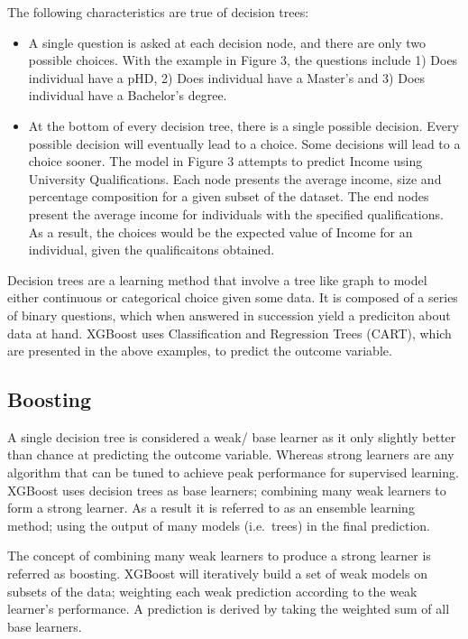 \documentclass[]{book}
\providecommand{\tightlist}{%
  \setlength{\itemsep}{0pt}\setlength{\parskip}{0pt}}
\begin{document}
The following characteristics are true of decision trees:

\begin{itemize}
\tightlist
\item
  A single question is asked at each decision node, and there are only
  two possible choices. With the example in Figure 3, the questions
  include 1) Does individual have a pHD, 2) Does individual have a
  Master's and 3) Does individual have a Bachelor's degree.\\
\item
  At the bottom of every decision tree, there is a single possible
  decision. Every possible decision will eventually lead to a choice.
  Some decisions will lead to a choice sooner. The model in Figure 3
  attempts to predict Income using University Qualifications. Each node
  presents the average income, size and percentage composition for a
  given subset of the dataset. The end nodes present the average income
  for individuals with the specified qualifications. As a result, the
  choices would be the expected value of Income for an individual, given
  the qualificaitons obtained.
\end{itemize}

Decision trees are a learning method that involve a tree like graph to
model either continuous or categorical choice given some data. It is
composed of a series of binary questions, which when answered in
succession yield a prediciton about data at hand. XGBoost uses
Classification and Regression Trees (CART), which are presented in the
above examples, to predict the outcome variable.

\subsection{Boosting}\label{boosting}

A single decision tree is considered a weak/ base learner as it only
slightly better than chance at predicting the outcome variable. Whereas
strong learners are any algorithm that can be tuned to achieve peak
performance for supervised learning. XGBoost uses decision trees as base
learners; combining many weak learners to form a strong learner. As a
result it is referred to as an ensemble learning method; using the
output of many models (i.e.~trees) in the final prediction.

The concept of combining many weak learners to produce a strong learner
is referred as boosting. XGBoost will iteratively build a set of weak
models on subsets of the data; weighting each weak prediction according
to the weak learner's performance. A prediction is derived by taking the
weighted sum of all base learners.
\end{document}
